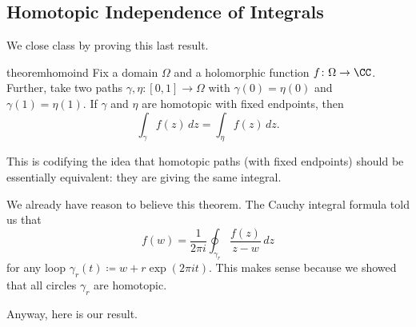 \subsection{Homotopic Independence of Integrals}
We close class by proving this last result.
\begin{restatable}{theorem}{homoind} \label{thm:homoind}
	Fix a domain $\Omega$ and a holomorphic function $f\colon \Omega\to\CC$. Further, take two paths $\gamma,\eta\colon [0,1]\to\Omega$ with $\gamma(0)=\eta(0)$ and $\gamma(1)=\eta(1)$. If $\gamma$ and $\eta$ are homotopic with fixed endpoints, then
	\[\int_\gamma f(z)\,dz=\int_\eta f(z)\,dz.\]
\end{restatable}
This is codifying the idea that homotopic paths (with fixed endpoints) should be essentially equivalent: they are giving the same integral.
\begin{example}
	We already have reason to believe this theorem. The Cauchy integral formula told us that
	\[f(w)=\frac1{2\pi i}\oint_{\gamma_r}\frac{f(z)}{z-w}\,dz\]
	for any loop $\gamma_r(t)\coloneqq w+r\exp(2\pi it)$. This makes sense because we showed that all circles $\gamma_r$ are homotopic.
\end{example}
Anyway, here is our result.
